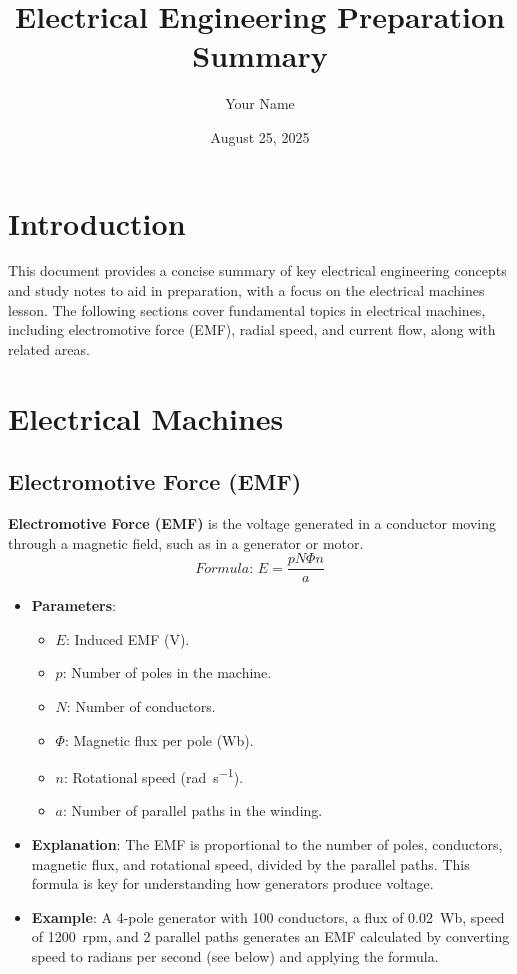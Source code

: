 \documentclass[12pt]{article}
\newcommand{\concept}[1]{\textbf{#1}}
\newcommand{\formula}[1]{\textit{Formula: }#1}
\begin{document}
\title{Electrical Engineering Preparation Summary}
\author{Your Name}
\date{August 25, 2025}
\maketitle

\tableofcontents
\newpage

\section{Introduction}
This document provides a concise summary of key electrical engineering concepts and study notes to aid in preparation, with a focus on the electrical machines lesson. The following sections cover fundamental topics in electrical machines, including electromotive force (EMF), radial speed, and current flow, along with related areas.

\section{Electrical Machines}
\subsection{Electromotive Force (EMF)}
\concept{Electromotive Force (EMF)} is the voltage generated in a conductor moving through a magnetic field, such as in a generator or motor.
\[
\formula{E = \frac{p N \Phi n}{a}}
\]
\begin{itemize}
    \item \textbf{Parameters}:
        \begin{itemize}
            \item \(E\): Induced EMF (\si{\volt}).
            \item \(p\): Number of poles in the machine.
            \item \(N\): Number of conductors.
            \item \(\Phi\): Magnetic flux per pole (\si{\weber}).
            \item \(n\): Rotational speed (\si{\radian\per\second}).
            \item \(a\): Number of parallel paths in the winding.
        \end{itemize}
    \item \textbf{Explanation}: The EMF is proportional to the number of poles, conductors, magnetic flux, and rotational speed, divided by the parallel paths. This formula is key for understanding how generators produce voltage.
    \item \textbf{Example}: A 4-pole generator with 100 conductors, a flux of \SI{0.02}{\weber}, speed of \SI{1200}{rpm}, and 2 parallel paths generates an EMF calculated by converting speed to radians per second (see below) and applying the formula.
\end{itemize}
\end{document}
